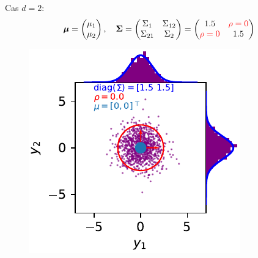 \documentclass[xcolor=svgnames, t]{beamer}
\newcommand{\vectorx}[1]{\boldsymbol{\MakeLowercase{\mathbf{#1}}}}
\newcommand{\matrixx}[1]{\boldsymbol{\MakeUppercase{#1}}}
\begin{document}
\begin{frame}
  Cas $d=2$:
  \begin{equation*}
    \vectorx{\mu}
    =
    \begin{pmatrix}
      \mu_1 \\
      \mu_2
    \end{pmatrix},
    \quad
    \matrixx{\Sigma}
    =
      \begin{pmatrix}
        \Sigma_{1} & \Sigma_{12} \\
        \Sigma_{21} & \Sigma_{2}
      \end{pmatrix}
    =
      \begin{pmatrix}
        1.5 & \color{red}\rho = 0 \\
        \color{red}\rho = 0 & 1.5
      \end{pmatrix}
  \end{equation*}
% 
  \begin{figure}
    \includegraphics{gaussian_2d_rho_null.pdf}
  \end{figure}
\end{frame}
\end{document}

